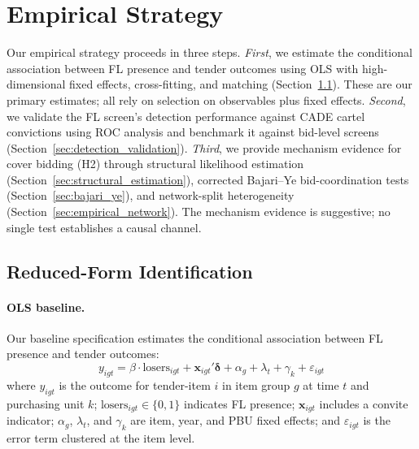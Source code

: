 

\section{Empirical Strategy}
\label{sec:empirical}

Our empirical strategy proceeds in three steps.
\emph{First}, we estimate the conditional association between FL
presence and tender outcomes using OLS with high-dimensional fixed
effects, cross-fitting, and matching (Section~\ref{sec:reduced_form}).
These are our primary estimates; all rely on selection on observables
plus fixed effects.
\emph{Second}, we validate the FL screen's detection performance
against CADE cartel convictions using ROC analysis and benchmark it
against bid-level screens
(Section~\ref{sec:detection_validation}).
\emph{Third}, we provide mechanism evidence for cover bidding (H2)
through structural likelihood estimation
(Section~\ref{sec:structural_estimation}), corrected Bajari--Ye
bid-coordination tests (Section~\ref{sec:bajari_ye}), and
network-split heterogeneity (Section~\ref{sec:empirical_network}).
The mechanism evidence is suggestive; no single test establishes a
causal channel.


\subsection{Reduced-Form Identification}
\label{sec:reduced_form}

\paragraph{OLS baseline.}
Our baseline specification estimates the conditional association between
FL presence and tender outcomes:
\begin{equation}
  y_{igt} = \beta \cdot \text{losers}_{igt} + \mathbf{x}_{igt}'
  \boldsymbol{\delta} + \alpha_g + \lambda_t + \gamma_k + \varepsilon_{igt}
  \label{eq:ols_main}
\end{equation}
where $y_{igt}$ is the outcome for tender-item $i$ in item group $g$ at
time $t$ and purchasing unit $k$; $\text{losers}_{igt} \in \{0,1\}$
indicates FL presence; $\mathbf{x}_{igt}$ includes a convite indicator;
$\alpha_g$, $\lambda_t$, and $\gamma_k$ are item, year, and PBU fixed
effects; and $\varepsilon_{igt}$ is the error term clustered at the item
level.

